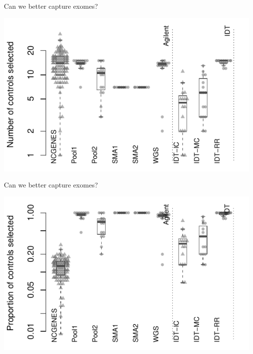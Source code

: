 \documentclass[
  10pt,
  ignorenonframetext,
  m]{beamer}
\begin{document}
\begin{frame}{Can we better capture exomes?}
\protect\hypertarget{can-we-better-capture-exomes-5}{}

\begin{center}\includegraphics{defense_files/figure-beamer/nSelected-1} \end{center}

\end{frame}

\begin{frame}{Can we better capture exomes?}
\protect\hypertarget{can-we-better-capture-exomes-6}{}

\begin{center}\includegraphics{defense_files/figure-beamer/propSelected-1} \end{center}

\end{frame}
\end{document}
